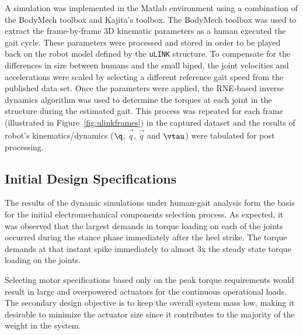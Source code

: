 A simulation was implemented in the Matlab environment using a combination of the BodyMech toolbox and Kajita's toolbox. The BodyMech toolbox was used to extract the frame-by-frame 3D kinematic parameters as a human executed the gait cycle. These parameters were processed and stored in order to be played back on the robot model defined by the \texttt{uLINK} structure. To compensate for the differences in size between humans and the small biped, the joint velocities and accelerations were scaled by selecting a different reference gait speed from the published data set. Once the parameters were applied, the RNE-based inverse dynamics algorithm was used to determine the torques at each joint in the structure during the estimated gait. This process was repeated for each frame (illustrated in Figure~\ref{fig:ulinkframes}) in the captured dataset and the results of robot's kinematics/dynamics ($\q$, $\vec{\dot{q}}$, $\vec{\ddot{q}}$ and $\vtau$) were tabulated for post processing. 


\subsection{Initial Design Specifications} %
\label{sec:initial_design_requirements}
The results of the dynamic simulations under human-gait analysis form the basis for the initial electromechanical components selection process. As expected, it was observed that the largest demands in torque loading on each of the joints occurred during the stance phase immediately after the heel strike. The torque demands at that instant spike immediately to almost 3x the steady state torque loading on the joints. 


Selecting motor specifications based only on the peak torque requirements would result in large and overpowered actuators for the continuous operational loads. The secondary design objective is to keep the overall system mass low, making it desirable to minimize the actuator size since it contributes to the majority of the weight in the system. 

